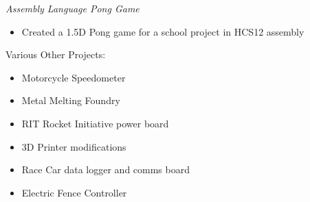 \documentclass[line,mmmargin]{res}
\begin{document}
\begin{resume}
	\vspace{-10pt}
	{\sl Assembly Language Pong Game}
		\begin{itemize} \itemsep -2pt
			\item Created a 1.5D Pong game for a school project in HCS12 assembly
		\end{itemize}
	\vspace{-10pt}
	{Various Other Projects:}
		\begin{multicols}{2}
			\begin{itemize}
				\itemsep -2pt
				\item[] Motorcycle Speedometer
				\item[] Metal Melting Foundry
				\item[] RIT Rocket Initiative power board
				\item[] 3D Printer modifications
				\item[] Race Car data logger and comms board
				\item[] Electric Fence Controller
			\end{itemize}
		\end{multicols}


\end{resume}
\end{document}
